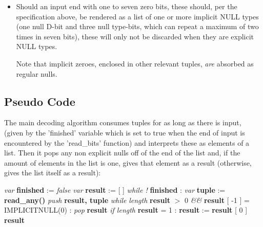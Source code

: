 \begin{itemize}
\item Should an input end with one to seven zero bits, these should, per the
  specification above, be rendered as a list of one or more implicit NULL types
  (one null D-bit and three null type-bits, which can repeat a maximum of
  two times in seven bits), these will only not be discarded when they
  are explicit NULL types.

  Note that implicit zeroes, enclosed in other relevant tuples, \textit{are}
  absorbed as regular nulls.
\end{itemize}

\subsection{Pseudo Code}

The main decoding algorithm consumes tuples for as long as there is input,
(given by the 'finished' variable which is set to true when the end of input
is encountered by the 'read\_bits' function)
and interprets these as elements of a list.
Then it pops any non explicit nulls off of the end of the list and, if the amount of
elements in the list is one, gives that element as a result
(otherwise, gives the list itself as a result):

\begin{changemargin}{-60mm}{0mm}
\begin{myquote}

\vbox{
\textit{var} \textbf{finished} := \textit{false} \newline
\textit{var} \textbf{result} := [ ] \newline
\textit{while !} \textbf{finished} : \newline
\indent\hspace{.5cm} \textit{var} \textbf{tuple} := \textbf{read\_any()} \newline
\indent\hspace{.5cm} \textit{push} \textbf{result, tuple} \newline
\textit{while} \textit{length} \textbf{result} $>$ 0 \textit{\&\&} \textbf{result} [ -1 ] = IMPLICITNULL(0) :\newline
\indent\hspace{.5cm} \textit{pop} \textbf{result} \newline
\textit{if length} \textbf{result} = 1 : \newline
\indent\hspace{.5cm} \textbf{result} := \textbf{result} [ 0 ] \newline
\textbf{result} \newline
}

\end{myquote}
\end{changemargin}

